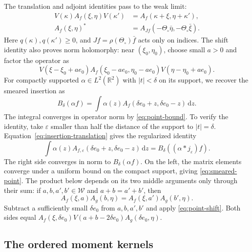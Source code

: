 \documentclass[11pt, letterpaper, reqno]{amsart}
\theoremstyle{definition}
\theoremstyle{remark}
\newcommand{\bbR}{\mathbb{R}}
\newcommand{\calW}{\mathcal{W}}
\newcommand{\dd}{\,\mathrm{d}}
\begin{document}
The translation and adjoint identities pass to the weak limit:
\begin{align}
 V(\kappa)A_f(\xi,\eta)V(\kappa')
   &=A_f(\kappa+\xi,\eta+\kappa'),\label{eq:point-shift}\\
 A_f(\xi,\eta)^*&=A_{Jf}(-\Theta_\circ\bar\eta,
                                      -\Theta_\circ\bar\xi).
 \label{eq:point-adjoint}
\end{align}
Here $q(\kappa),q(\kappa')\geq0$, and $Jf=\rho(\Theta_\circ)\bar f$
acts only on indices. The shift identity also proves norm holomorphy:
near $(\xi_0,\eta_0)$, choose small $a>0$ and factor the operator as
\begin{equation}
 V(\xi-\xi_0+ae_0)A_f(\xi_0-ae_0,\eta_0-ae_0)
          V(\eta-\eta_0+ae_0).
\end{equation}
For compactly supported $\alpha\in L^2(\bbR^2)$ with $|t|<\delta$
on its support, we recover the smeared insertion as
\begin{equation}\label{eq:smeared-point}
 B_\delta(\alpha f)=\int\alpha(z)
               A_f(\delta e_0+z,\delta e_0-z)\dd z.
\end{equation}
The integral converges in operator norm by \eqref{eq:point-bound}.
To verify the identity, take $\varepsilon$ smaller than half the distance
of the support to $|t|=\delta$. Equation~\eqref{eq:insertion-translation}
gives the regularized identity
\begin{equation}
 \int\alpha(z)A_{f,\varepsilon}(\delta e_0+z,\delta e_0-z)\dd z
       =B_\delta((\alpha*j_\varepsilon)f).
\end{equation}
The right side converges in norm to $B_\delta(\alpha f)$.
On the left, the matrix elements converge under a uniform bound
on the compact support, giving \eqref{eq:smeared-point}.
The product below depends on its two middle arguments only through
their sum: if $a,b,a',b'\in\calW$ and $a+b=a'+b'$, then
\begin{equation}\label{eq:gap-splitting}
 A_f(\xi,a)A_g(b,\eta)=A_f(\xi,a')A_g(b',\eta).
\end{equation}
Subtract a sufficiently small $\delta e_0$ from $a,b,a',b'$
and apply \eqref{eq:point-shift}. Both sides equal
$A_f(\xi,\delta e_0)V(a+b-2\delta e_0)A_g(\delta e_0,\eta)$.

\subsection{The ordered moment kernels}\label{subsec:ordered}
\end{document}
